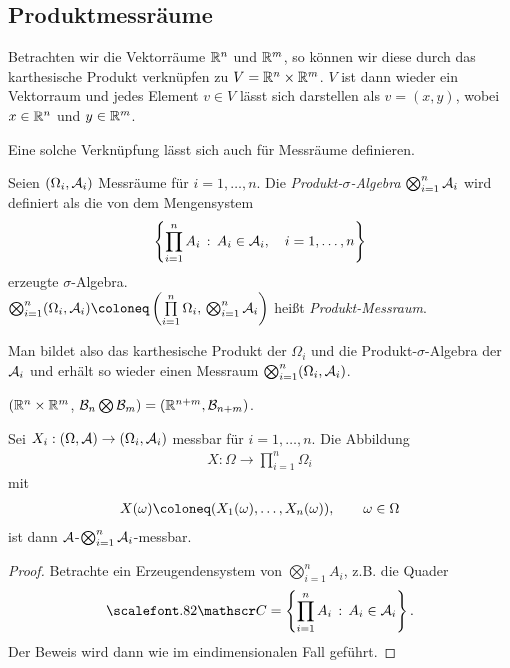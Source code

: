 \subsection{Produktmessräume}

Betrachten wir die Vektorräume $\R^n$ und $\R^m$, so können wir diese durch das
karthesische Produkt verknüpfen zu $V=\R^n\times \R^m$. $V$ ist dann wieder
ein Vektorraum und jedes Element $v\in V$ lässt sich darstellen als
$v=(x,y)$, wobei $x\in\R^n$ und $y\in\R^m$.

Eine solche Verknüpfung lässt sich auch für Messräume definieren.

\begin{defn}
\label{defn:3.5}
Seien $(\Omega _{i}, \AA_{i})$ Messräume für $i= 1, \ldots ,n$.
Die \emph{Produkt-$\sigma$-Algebra}
$\bigotimes^{n}_{i=1} \AA_{i} $ wird definiert als die von dem
Mengensystem
\begin{align*}
\setdef{
\prod\limits^{n}_{i=1}A_{i}
}{
A_{i} \in \AA_{i},\quad  i= 1, \ldots ,n}
\end{align*}
erzeugte $\sigma$-Algebra.\\
$\bigotimes^{n}_{i=1}(\Omega _{i}, \AA_{i}) \defl
\left(\prod\limits^{n}_{i=1} \Omega _{i},\,
\bigotimes^{n}_{i=1} \AA_{i}\right)$
heißt \emph{Produkt-Messraum}.\fishhere
\end{defn}

Man bildet also das karthesische Produkt der $\Omega_i$ und die
Produkt-$\sigma$-Algebra der $\AA_i$ und erhält so wieder einen Messraum
$\bigotimes_{i=1}^n (\Omega_i,\AA_i)$.

\begin{bsp}
$(\R^n\times\R^m$, ${\BB}_{n} \bigotimes {\BB}_{m}) =
(\R^{n+m},{\BB}_{n+m})$.\bsphere
\end{bsp}

\begin{bem}
\label{bem:3.3}
Sei $X_{i}: (\Omega , \AA) \to (\Omega _{i},
\AA_{i})$ messbar für $i=1, \ldots , n$. Die Abbildung
\begin{align*}
X: \Omega \to \prod^{n}_{i=1} \Omega _{i}
\end{align*}
mit
\begin{align*}
X(\omega )\defl (X_{1} (\omega ), \ldots , X_{n}(\omega )), \qquad \omega \in
\Omega
\end{align*}
ist dann $\AA$-$\bigotimes^{n}_{i=1}\AA_{i}$-messbar.\maphere
\end{bem}
\begin{proof}
Betrachte ein Erzeugendensystem von $\bigotimes_{i=1}^n A_i$, z.B. die Quader
\begin{align*}
\CC = \setdef{\prod\limits_{i=1}^n A_i}{A_i\in\AA_i}.
\end{align*}
Der Beweis wird dann wie im eindimensionalen Fall geführt.\qedhere
\end{proof}

